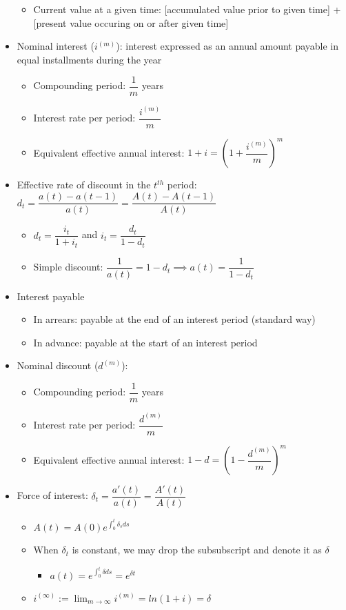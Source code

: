 \documentclass{article}
\begin{document}
\begin{itemize}
\begin{itemize}
              \item Current value at a given time: [accumulated value prior to given time] + [present value occuring on or after given time]
          \end{itemize}
    \item Nominal interest ($i^{(m)}$): interest expressed as an annual amount payable in equal installments during the year
          \begin{itemize}
              \item Compounding period: $\dfrac{1}{m}$ years
              \item Interest rate per period: $\dfrac{i^{(m)}}{m}$
              \item Equivalent effective annual interest: $1+i=\left(1+\dfrac{i^{(m)}}{m}\right)^m$
          \end{itemize}
    \item Effective rate of discount in the $t^{th}$ period: $d_t=\dfrac{a(t)-a(t-1)}{a(t)}=\dfrac{A(t)-A(t-1)}{A(t)}$
          \begin{itemize}
              \item $d_t=\dfrac{i_t}{1+i_t}$ and $i_t=\dfrac{d_t}{1-d_t}$
              \item Simple discount: $\dfrac{1}{a(t)}=1-d_t \implies a(t)=\dfrac{1}{1-d_t}$
          \end{itemize}
    \item Interest payable
          \begin{itemize}
              \item In arrears: payable at the end of an interest period (standard way)
              \item In advance: payable at the start of an interest period
          \end{itemize}
    \item Nominal discount ($d^{(m)}$):
          \begin{itemize}
              \item Compounding period: $\dfrac{1}{m}$ years
              \item Interest rate per period: $\dfrac{d^{(m)}}{m}$
              \item Equivalent effective annual interest: $1-d=\left(1-\dfrac{d^{(m)}}{m}\right)^m$
          \end{itemize}
    \item Force of interest: $\delta_t=\dfrac{a'(t)}{a(t)}=\dfrac{A'(t)}{A(t)}$
          \begin{itemize}
              \item $A(t)=A(0)e^{\int_0^t\delta_s ds}$
              \item When $\delta_t$ is constant, we may drop the subsubscript and denote it as $\delta$
                    \begin{itemize}
                        \item $a(t)=e^{\int_0^t\delta ds}=e^{\delta t}$
                    \end{itemize}
              \item $i^{(\infty)}:=\lim_{m\rightarrow\infty}i^{(m)}=ln(1+i)=\delta$
          \end{itemize}
\end{itemize}
\end{document}
